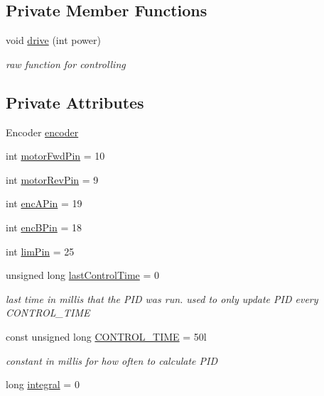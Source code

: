 \subsection*{Private Member Functions}
\begin{DoxyCompactItemize}
\item 
void \hyperlink{classArm_aef69c0a871a4443e3e1109c5a742e4b8}{drive} (int power)
\begin{DoxyCompactList}\small\item\em raw function for controlling \end{DoxyCompactList}\end{DoxyCompactItemize}
\subsection*{Private Attributes}
\begin{DoxyCompactItemize}
\item 
Encoder \hyperlink{classArm_afe912e5b20439c082abb66920658805c}{encoder}
\item 
int \hyperlink{classArm_ad4a5718ff10ff30ece49108effc28dd2}{motor\-Fwd\-Pin} = 10
\item 
int \hyperlink{classArm_a0d5927881e33ce4e039a71e83d7caf6a}{motor\-Rev\-Pin} = 9
\item 
int \hyperlink{classArm_ad36ceeef302fda4b8e162feae7961c41}{enc\-A\-Pin} = 19
\item 
int \hyperlink{classArm_ab1111e111610b38214e703cd88887f24}{enc\-B\-Pin} = 18
\item 
int \hyperlink{classArm_aade413d7d638bff08bcc0c9ac50818e1}{lim\-Pin} = 25
\item 
unsigned long \hyperlink{classArm_a99d553dd144c5fd2bf8b4c68a66fea1b}{last\-Control\-Time} = 0
\begin{DoxyCompactList}\small\item\em last time in millis that the P\-I\-D was run. used to only update P\-I\-D every C\-O\-N\-T\-R\-O\-L\-\_\-\-T\-I\-M\-E \end{DoxyCompactList}\item 
const unsigned long \hyperlink{classArm_ae85014b5f9a8698790faa73bae76217c}{C\-O\-N\-T\-R\-O\-L\-\_\-\-T\-I\-M\-E} = 50l
\begin{DoxyCompactList}\small\item\em constant in millis for how often to calculate P\-I\-D \end{DoxyCompactList}\item 
long \hyperlink{classArm_aef466ce8350e1d73ed9a7b529512e90c}{integral} = 0

\end{DoxyCompactItemize}

